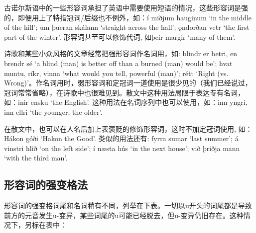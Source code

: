 古诺尔斯语中的一些形容词承担了英语中需要使用短语的情况，这些形容词是强的，即便用上了特指冠词/后缀也不例外，如：í
miðjum hauginum `in the middle of the hill‌'; um þueran skálann `straight
across the hall‌'; ǫndorðan vetr `the first part of the winter‌'.
形容词甚至可以修饰代词, 如þeir margir `many of them‌'.

诗歌和某些小众风格的文章经常把强形容词作名词用，如: blindr er betri, en
brendr sé `a blind (man) is better off than a burned (man) would be‌';
hvat muntu, ríkr, vinna `what would you tell, powerful (man)‌'; rétt
`Right (vs.
Wrong)‌'。作名词用时，弱形容词和定冠词一道使用是很少见的（我们已经说过，冠词常常省略），在诗歌中也很难见到。散文中这种用法局限于表达专有名词，如：inir
ensku `the English‌'. 这种用法在名词序列中也可以使用，如：inn yngri, inn
ellri `the younger, the older‌'.

在散文中，也可以在人名后加上表褒贬的修饰形容词，这时不加定冠词使用,
如：Hákon góði `Hakon the Good‌'. 类似的用法还有: fyrra sumar `last
summer‌'; á vinstri hlið `on the left side‌'; í næsta hús `in the next
house‌'; við þriðja mann `with the third man‌'.

\subsection{形容词的强变格法}\label{ux5f62ux5bb9ux8bcdux7684ux5f3aux53d8ux683cux6cd5}

形容词的强变格词尾和名词稍有不同，列举在下表。一切以u开头的词尾都是导致前方的元音发生u-变异，某些词尾的u可能已经脱去，但u-变异仍旧存在。这种情况下，另标在表中：

